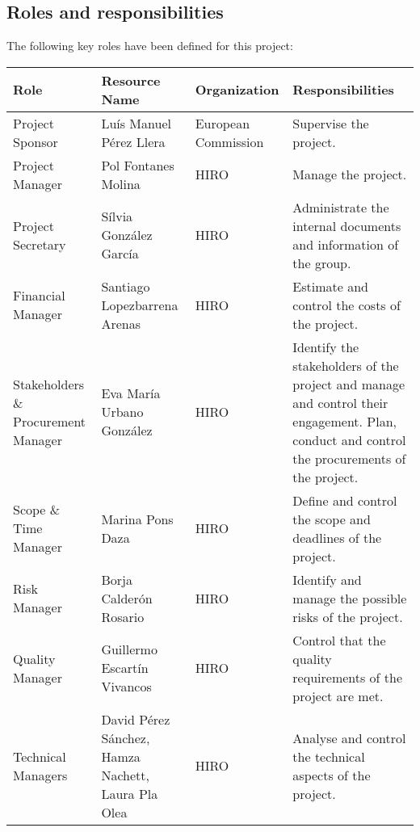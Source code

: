 \subsection{Roles and responsibilities}
The following key roles have been defined for this project:
	
	\begin{longtable}{>{\raggedright\arraybackslash}p{2.5cm} >{\raggedright\arraybackslash}p{2.8cm} >{\raggedright\arraybackslash}p{3cm}>{\raggedright\arraybackslash}p{5cm}}
		
		\toprule[2pt]

		\textbf{Role} & \textbf{Resource Name} & \textbf{Organization} & \textbf{Responsibilities} 
		\\ \midrule[1.5pt] 

		Project Sponsor & Luís Manuel Pérez Llera & European Commission & Supervise the project. \\ \midrule

		Project Manager & Pol Fontanes Molina & HIRO & Manage the project. \\ \midrule

		Project Secretary & Sílvia González García & HIRO & Administrate the internal documents and information of the group. \\ \midrule

		Financial Manager & Santiago Lopezbarrena Arenas & HIRO & Estimate and control the costs of the project. \\ \midrule

		Stakeholders \& Procurement Manager & Eva María Urbano González & HIRO & Identify the stakeholders of the project and manage and control their engagement.\newline 
		Plan, conduct and control the procurements of the project.\\ \midrule
		
		Scope \& Time Manager & Marina Pons Daza & HIRO & Define and control the scope and deadlines of the project. \\ \midrule

		Risk Manager & Borja Calderón Rosario & HIRO & Identify and manage the possible risks of the project. \\ \midrule

		Quality Manager & Guillermo Escartín Vivancos & HIRO & Control that the quality requirements of the project are met. \\ \midrule

		Technical Managers & David Pérez Sánchez, \newline  Hamza Nachett, \newline  Laura Pla Olea & HIRO & Analyse and control the technical aspects of the project. \\ \midrule


\end{longtable}
